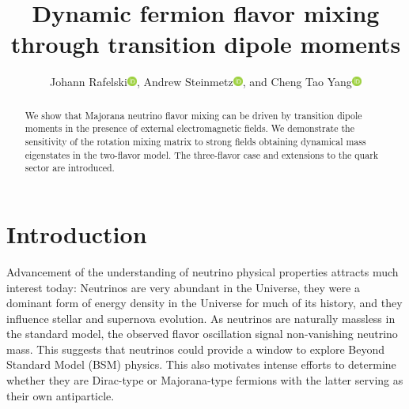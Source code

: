 \documentclass{ws-ijmpa}
\newcommand{\orcidicon}{\includegraphics[width=0.32cm]{orcid.pdf}}
\newcommand{\orc}[1]{\href{https://orcid.org/#1}{\orcidicon}}
\newcommand{\orcA}{0000-0001-8217-1484}
\newcommand{\orcB}{0000-0001-5038-8427}
\newcommand{\orcC}{0000-0001-5474-2649}
\begin{document}

%
\catchline{}{}{}{}{}
%

\title{Dynamic fermion flavor mixing through transition dipole moments}

\author{Johann Rafelski\orc{\orcA}, Andrew Steinmetz\orc{\orcC}, and Cheng Tao Yang\orc{\orcB}}

\address{Department of Physics, The University of Arizona, Tucson, AZ 85721, USA}

\maketitle

\begin{history}
\end{history}

\begin{abstract}
We show that Majorana neutrino flavor mixing can be driven by transition dipole moments in the presence of external electromagnetic fields. We demonstrate the sensitivity of the rotation mixing matrix to strong fields obtaining dynamical mass eigenstates in the two-flavor model. The three-flavor case and extensions to the quark sector are introduced.

\end{abstract}


\section{Introduction}
\label{sec:intro}

Advancement of the understanding of neutrino physical properties attracts much interest today: Neutrinos are very abundant in the Universe, they were a dominant form of energy density in the Universe for much of its history, and they influence stellar and supernova evolution. As neutrinos are naturally massless in the standard model, the observed flavor oscillation signal non-vanishing neutrino mass. This suggests that neutrinos could provide a window to explore Beyond Standard Model (BSM) physics. This also motivates intense efforts to determine whether they are Dirac-type or Majorana-type fermions with the latter serving as their own antiparticle.
\end{document}
